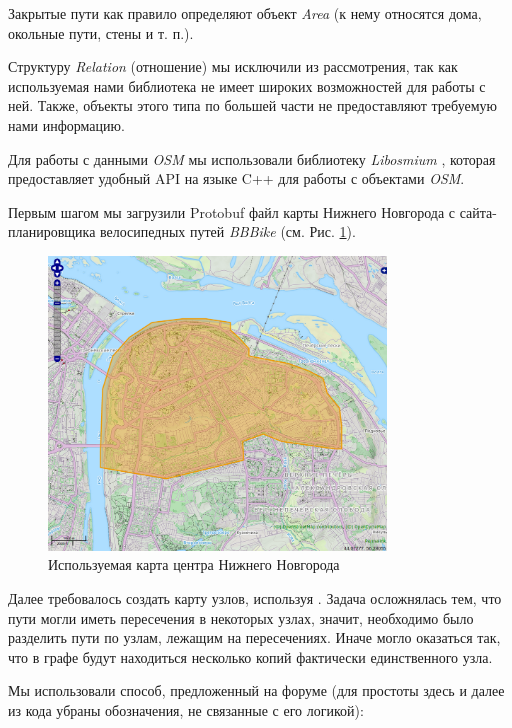 \documentclass[11pt]{article}
\begin{document}
    	Закрытые пути как правило определяют объект \textit{Area} (к нему относятся дома, окольные пути, стены и т. п.).
    	
    	Структуру \textit{Relation} (отношение) мы исключили из рассмотрения, так как используемая нами библиотека не имеет широких возможностей для работы с ней.
    	Также, объекты этого типа по большей части не предоставляют требуемую нами информацию.    
    
	Для работы с данными \textit{OSM} мы использовали библиотеку \textit{Libosmium} \cite{libosm}, которая предоставляет удобный API на языке C++ для работы с объектами \textit{OSM}.
	
	Первым шагом мы загрузили Protobuf файл карты Нижнего Новгорода с сайта-планировщика велосипедных путей \textit{BBBike} \cite{bbbike} (см. Рис. \ref{fig:bbbike}).

	\begin{figure}[ht]
	\centering	
	\includegraphics[width=0.8\textwidth]{pics/bbbike.png}
	\caption{Используемая карта центра Нижнего Новгорода}
	\label{fig:bbbike}
	\end{figure}
	
	Далее требовалось создать карту узлов, используя \cite{libosm}.
	Задача осложнялась тем, что пути могли иметь пересечения в некоторых узлах, значит, необходимо было разделить пути по узлам, лежащим на пересечениях.
	Иначе могло оказаться так, что в графе будут находиться несколько копий фактически единственного узла.
	
	Мы использовали способ, предложенный на форуме \cite{forum} (для простоты здесь и далее из кода убраны обозначения, не связанные с его логикой):
	
\end{document}
